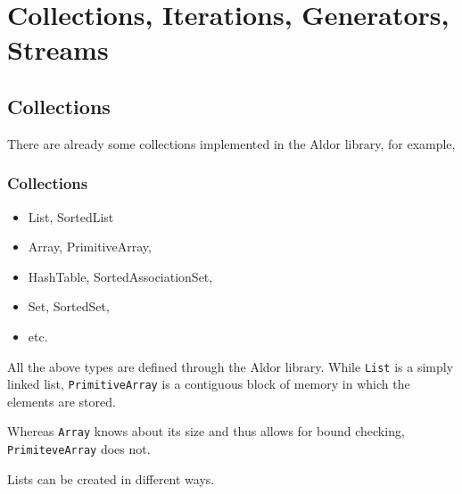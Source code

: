 \section{Collections, Iterations, Generators, Streams}
\subsection{Collections}

There are already some collections implemented in the Aldor library,
for example,


\begin{frame}[fragile]
  \frametitle<presentation>{Collections}
\begin{itemize}
\item {List}, SortedList
\item {Array}, PrimitiveArray,
\item {HashTable}, SortedAssociationSet,
\item Set, SortedSet,
\item etc.
\end{itemize}
\end{frame}


All the above types are defined through the Aldor library. While
\texttt{List} is a simply linked list, \texttt{PrimitiveArray} is a
contiguous block of memory in which the elements are stored.

Whereas \texttt{Array} knows about its size and thus allows for bound
checking, \texttt{PrimiteveArray} does not.











Lists can be created in different ways.
\begin{myverbatim}
\end{myverbatim}

